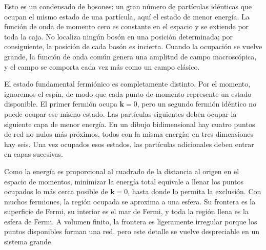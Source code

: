 Esto es un condensado de bosones: un gran número de partículas idénticas que ocupan el mismo estado de una partícula, aquí el estado de menor energía. La función de onda de momento cero es constante en el espacio y se extiende por toda la caja. No localiza ningún bosón en una posición determinada; por consiguiente, la posición de cada bosón es incierta. Cuando la ocupación se vuelve grande, la función de onda común genera una amplitud de campo macroscópica, y el campo se comporta cada vez más como un campo clásico.

El estado fundamental fermiónico es completamente distinto. Por el momento, ignoremos el espín, de modo que cada punto de momento represente un estado disponible. El primer fermión ocupa \(\mathbf{k}=0\), pero un segundo fermión idéntico no puede ocupar ese mismo estado. Las partículas siguientes deben ocupar la siguiente capa de menor energía. En un dibujo bidimensional hay cuatro puntos de red no nulos más próximos, todos con la misma energía; en tres dimensiones hay seis. Una vez ocupados esos estados, las partículas adicionales deben entrar en capas sucesivas.

Como la energía es proporcional al cuadrado de la distancia al origen en el espacio de momentos, minimizar la energía total equivale a llenar los puntos ocupados lo más cerca posible de \(\mathbf{k}=0\), hasta donde lo permita la exclusión. Con muchos fermiones, la región ocupada se aproxima a una esfera. Su frontera es la superficie de Fermi, su interior es el mar de Fermi, y toda la región llena es la esfera de Fermi. A volumen finito, la frontera es ligeramente irregular porque los puntos disponibles forman una red, pero este detalle se vuelve despreciable en un sistema grande.

